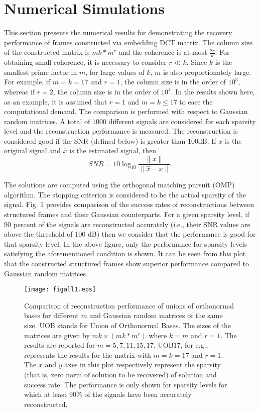 \documentclass{IEEEtran}
\begin{document}
\section{Numerical Simulations}
This section presents the numerical results for demonstrating the
recovery performance of frames constructed via embedding DCT matrix.
The column size of the constructed matrix is $mk*m^{r}$ and the coherence is
at most $\frac{2r}{k}$. For obtaining small coherence, it is necessary to
consider $r \ll k$. Since $k$ is the smallest prime factor in $m$,
for large values of $k$, $m$ is also proportionately large. For example,
if $m = k = 17$ and $r=1$, the column size is in the order of $10^3$, whereas
if $r=2$, the column size is in the order of $10^4$. 
In the results shown here, as an example, it is assumed that $r=1$ and
$m=k\leq 17$ to ease the computational demand.
The comparison is performed with respect to Gaussian random matrices. A total
of $1000$ different signals are considered for each sparsity level and
the reconstruction performance is measured. The reconstruction is
considered good if the SNR (defined below) is greater than $100$dB.
If $x$ is the original signal and $\hat{x}$ is the estimated signal, then
\[SNR = 10\log_{10}\frac{\|x\|}{\|\hat{x}-x\|}.\]

The solutions are computed using the orthogonal matching
pursuit (OMP) algorithm. The stopping criterion is considered to be
the actual sparsity of the signal. Fig. 1 provides comparison
of the success rates of reconstructions between  structured frames and
their Gaussian counterparts. For a given sparsity level, if $90$ percent
of the signals are reconstructed accurately (i.e., their SNR values are above
the
threshold of 100 dB) then we consider that the performance is good for that
sparsity level.  In the above figure, only the performance for sparsity
levels satisfying the aforementioned condition is shown.
It can be seen from this plot that the constructed structured frames show
superior performance compared to Gaussian random matrices.
\begin{figure}
  \label{fig1}   
\centering
\texttt{[image: figall1.eps]}
\caption{Comparison of reconstruction performance of unions of
  orthonormal bases for different $m$ and Gaussian random matrices of the
  same size. UOB stands for Union of Orthonormal Bases. 
  The sizes of the matrices are given by $mk \times (mk*m^r)$
  where $k=m$ and $r=1$. The results are reported for $m=5,7,11,15,17$.
  UOB17, for e.g., represents the results for the matrix with $m=k=17$ and
  $r=1$. The $x$
  and $y$ axes in this plot respectively represent the sparsity (that is, zero
  norm of solution to be recovered) of solution and success rate.
  The performance is only shown for sparsity levels for which at least
  $90\%$ of the signals have been accurately reconstructed.}
\end{figure}
\end{document}
